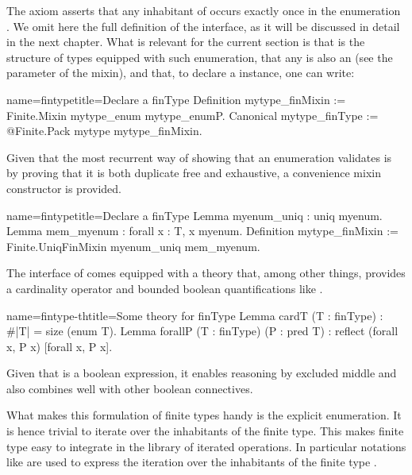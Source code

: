 The axiom asserts that any inhabitant of  occurs exactly once
in the enumeration .  We omit here the full definition of the
interface, as it will be discussed in detail in the next chapter.
What is relevant for the current section is that  is the
structure of types equipped with such enumeration, that any 
is also an  (see the parameter of the mixin), and that,
to declare a  instance, one can write:

\begin{coq}{name=fintype}{title=Declare a finType}
Definition mytype_finMixin := Finite.Mixin mytype_enum mytype_enumP.
Canonical mytype_finType := @Finite.Pack mytype mytype_finMixin.
\end{coq}

Given that the most recurrent way of showing that an enumeration
validates  is by proving that it is both duplicate free
and exhaustive, a convenience mixin constructor is provided.

\begin{coq}{name=fintype}{title=Declare a finType}
Lemma myenum_uniq : uniq myenum.
Lemma mem_myenum : forall x : T, x \in myenum.
Definition mytype_finMixin := Finite.UniqFinMixin myenum_uniq mem_myenum.
\end{coq}

The interface of  comes equipped with a theory that, among
other things, provides a cardinality operator  and bounded
boolean quantifications like \C{[forall x, P]}.

\begin{coq}{name=fintype-th}{title=Some theory for finType}
Lemma cardT (T : finType) : #|T| = size (enum T).
Lemma forallP (T : finType) (P : pred T) : reflect (forall x, P x) [forall x, P x].
\end{coq}

Given that \C{[forall x, P x]} is a boolean expression,
it enables reasoning by excluded middle and also combines well with
other boolean connectives.

What makes this formulation of finite types handy is the explicit
enumeration.  It is hence trivial to iterate over the inhabitants of the
finite type.  This makes finite type easy to integrate in the
library of iterated operations.  In particular notations like
 are used to express the iteration over the
inhabitants of the finite type .

